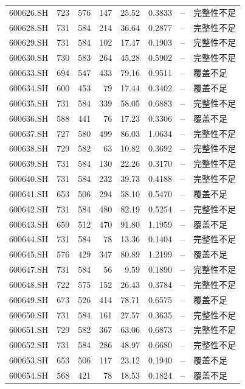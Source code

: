 \documentclass[10pt,a4paper]{article}
\begin{document}
\begin{longtable}{lrrr r r r l}
600626.SH & 723 & 576 & 147 & 25.52 & 0.3833 & -- & 完整性不足\\
600628.SH & 731 & 584 & 214 & 36.64 & 0.2877 & -- & 完整性不足\\
600629.SH & 731 & 584 & 102 & 17.47 & 0.1903 & -- & 完整性不足\\
600630.SH & 730 & 583 & 264 & 45.28 & 0.5902 & -- & 完整性不足\\
600633.SH & 694 & 547 & 433 & 79.16 & 0.9511 & -- & 覆盖不足\\
600634.SH & 600 & 453 & 79 & 17.44 & 0.3402 & -- & 覆盖不足\\
600635.SH & 731 & 584 & 339 & 58.05 & 0.6883 & -- & 完整性不足\\
600636.SH & 588 & 441 & 76 & 17.23 & 0.3306 & -- & 覆盖不足\\
600637.SH & 727 & 580 & 499 & 86.03 & 1.0634 & -- & 完整性不足\\
600638.SH & 729 & 582 & 63 & 10.82 & 0.3692 & -- & 完整性不足\\
600639.SH & 731 & 584 & 130 & 22.26 & 0.3170 & -- & 完整性不足\\
600640.SH & 731 & 584 & 232 & 39.73 & 0.4188 & -- & 完整性不足\\
600641.SH & 653 & 506 & 294 & 58.10 & 0.5470 & -- & 覆盖不足\\
600642.SH & 731 & 584 & 480 & 82.19 & 0.5254 & -- & 完整性不足\\
600643.SH & 659 & 512 & 470 & 91.80 & 1.1959 & -- & 覆盖不足\\
600644.SH & 731 & 584 & 78 & 13.36 & 0.1404 & -- & 完整性不足\\
600645.SH & 576 & 429 & 347 & 80.89 & 1.2199 & -- & 覆盖不足\\
600647.SH & 731 & 584 & 56 & 9.59 & 0.1890 & -- & 完整性不足\\
600648.SH & 722 & 575 & 152 & 26.43 & 0.3784 & -- & 完整性不足\\
600649.SH & 673 & 526 & 414 & 78.71 & 0.6575 & -- & 覆盖不足\\
600650.SH & 731 & 584 & 161 & 27.57 & 0.3635 & -- & 完整性不足\\
600651.SH & 729 & 582 & 367 & 63.06 & 0.6873 & -- & 完整性不足\\
600652.SH & 731 & 584 & 286 & 48.97 & 0.6680 & -- & 完整性不足\\
600653.SH & 653 & 506 & 117 & 23.12 & 0.1940 & -- & 覆盖不足\\
600654.SH & 568 & 421 & 78 & 18.53 & 0.1824 & -- & 覆盖不足\\

\end{longtable}
\end{document}
